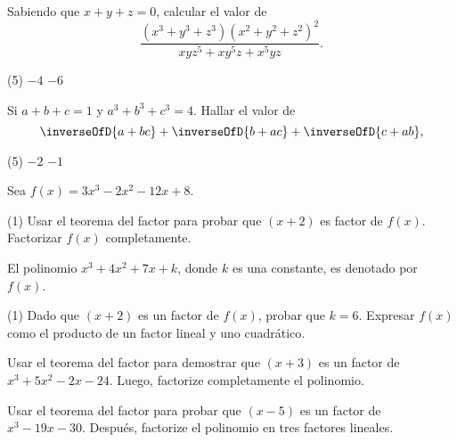 \begin{multicols}{2}
    \begin{exercise}
        Sabiendo que $x + y + z = 0$, calcular el valor de
        \[
            \frac{(x^3 + y^3 + z^3)(x^2 + y^2 + z^2)^2}{xyz^5 + xy^5 z + x^5 yz}.
        \]
        \begin{tasks}(5)
            \task $-4$
            \task $-6$
        \end{tasks}
    \end{exercise}

    \begin{exercise}
        Si $a + b + c = 1$ y $a^3 + b^3 + c^3 = 4$.
        Hallar el valor de
        \[
            \inverseOfD{a + bc} + \inverseOfD{b + ac} + \inverseOfD{c + ab},
        \]
        \begin{tasks}(5)
            \task $-2$
            \task $-1$
        \end{tasks}
    \end{exercise}

    \begin{exercise}
        Sea $f(x) = 3x^3 - 2x^2 - 12x + 8$.
        \begin{tasks}[label=\alph*.](1)
            \task Usar el teorema del factor para probar que $(x + 2)$ es factor de $f(x)$.
            \task Factorizar $f(x)$ completamente.
        \end{tasks}
    \end{exercise}

    \begin{exercise}
        El polinomio $x^3 + 4x^2 + 7x + k$, donde $k$ es una constante, es denotado por $f(x)$.
        \begin{tasks}[label=\alph*.](1)
            \task Dado que $(x + 2)$ es un factor de $f(x)$, probar que $k = 6$.
            \task Expresar $f(x)$ como el producto de un factor lineal y uno cuadrático.
        \end{tasks}
    \end{exercise}

    \begin{exercise}
        Usar el teorema del factor para demostrar que $(x + 3)$ es un factor de $x^3 + 5x^2 - 2x - 24$.
        Luego, factorize completamente el polinomio.
    \end{exercise}

    \begin{exercise}
        Usar el teorema del factor para probar que $(x - 5)$ es un factor de $x^3 - 19x - 30$.
        Después, factorize el polinomio en tres factores lineales.
    \end{exercise}


\end{multicols}
